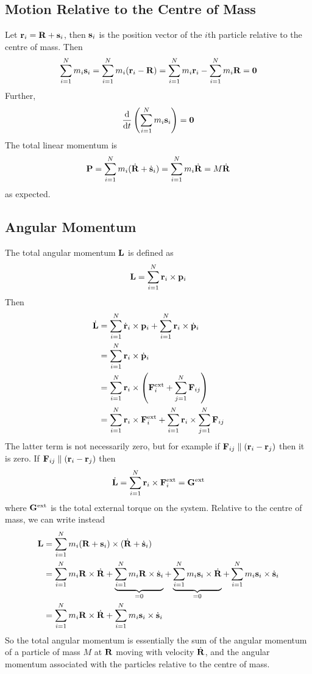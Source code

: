 \documentclass{article}
\begin{document}
\subsection{Motion Relative to the Centre of Mass}
Let $\vb r_i = \vb R + \vb s_i$, then $\vb s_i$ is the position vector of the $i$th particle relative to the centre of mass. Then
\[ \sum_{i=1}^N m_i \vb s_i = \sum_{i=1}^Nm_i (\vb r_i - \vb R) = \sum_{i=1}^N m_i \vb r_i - \sum_{i=1}^N m_i \vb R = \vb 0 \]
Further,
\[ \dv{t} \left( \sum_{i=1}^N m_i \vb s_i \right) = \vb 0 \]
The total linear momentum is
\[ \vb P = \sum_{i=1}^N m_i (\dot{\vb R} + \dot{\vb s}_i) = \sum_{i=1}^N m_i \dot{\vb R} = M\dot{\vb R} \]
as expected.

\subsection{Angular Momentum}
The total angular momentum $\vb L$ is defined as
\[ \vb L = \sum_{i=1}^N \vb r_i \times \vb p_i \]
Then
\begin{align*}
    \dot{\vb L} & = \sum_{i=1}^N \dot{\vb r}_i \times \vb p_i + \sum_{i=1}^N \vb r_i \times \dot{\vb p}_i                \\
                & = \sum_{i=1}^N \vb r_i \times \dot{\vb p}_i                                                            \\
                & = \sum_{i=1}^N \vb r_i \times \left( \vb F_i^\text{ext} + \sum_{j=1}^N \vb F_{ij} \right)              \\
                & = \sum_{i=1}^N \vb r_i \times \vb F_i^\text{ext} + \sum_{i=1}^N \vb r_i \times \sum_{j=1}^N \vb F_{ij} \\
\end{align*}
The latter term is not necessarily zero, but for example if $\vb F_{ij} \parallel (\vb r_i - \vb r_j)$ then it is zero. If $\vb F_{ij} \parallel (\vb r_i - \vb r_j)$ then
\[ \dot{\vb L} = \sum_{i=1}^N \vb r_i \times \vb F_i^\text{ext} = \vb G^\text{ext} \]
where $\vb G^\text{ext}$ is the total external torque on the system. Relative to the centre of mass, we can write instead
\begin{align*}
    \vb L & = \sum_{i=1}^N m_i (\vb R + \vb s_i) \times (\dot{\vb R} + \dot{\vb s}_i)                                                                                                                                                   \\
          & = \sum_{i=1}^N m_i \vb R \times \dot{\vb R} + \underbrace{\sum_{i=1}^N m_i \vb R \times \dot{\vb s}_i}_{=0} + \underbrace{\sum_{i=1}^N m_i \vb s_i \times \dot{\vb R}}_{=0} + \sum_{i=1}^N m_i \vb s_i \times \dot{\vb s}_i \\
          & = \sum_{i=1}^N m_i \vb R \times \dot{\vb R} + \sum_{i=1}^N m_i \vb s_i \times \dot{\vb s}_i
\end{align*}
So the total angular momentum is essentially the sum of the angular momentum of a particle of mass $M$ at $\vb R$ moving with velocity $\dot{\vb R}$, and the angular momentum associated with the particles relative to the centre of mass.
\end{document}
